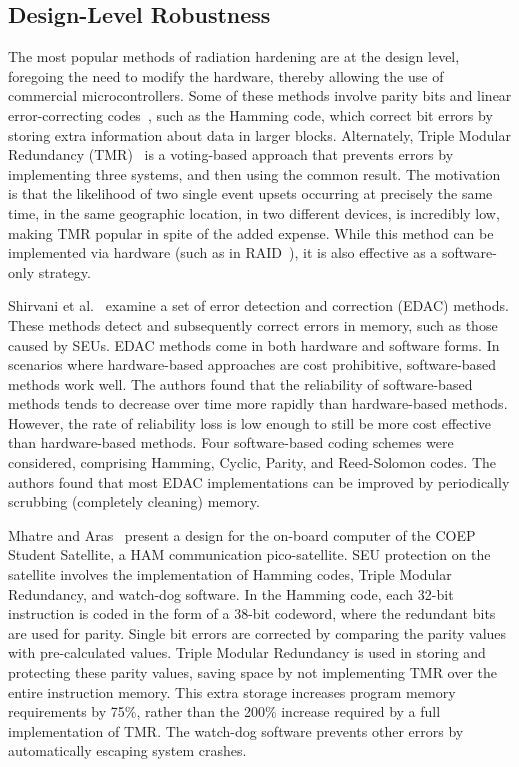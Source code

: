 \subsection{Design-Level Robustness}

The most popular methods of radiation hardening are at the design level, foregoing the need to modify the hardware, thereby allowing the use of commercial microcontrollers.
Some of these methods involve parity bits and linear error-correcting codes~\cite{ErrorCorrectingCodes}, such as the Hamming code, which correct bit errors by storing extra information about data in larger blocks.
Alternately, Triple Modular Redundancy (TMR)~\cite{TMR} is a voting-based approach that prevents errors by implementing three systems, and then using the common result.
The motivation is that the likelihood of two single event upsets occurring at precisely the same time, in the same geographic location, in two different devices, is incredibly low, making TMR popular in spite of the added expense.
While this method can be implemented via hardware (such as in RAID~\cite{RAID}), it is also effective as a software-only strategy.

Shirvani et al.~\cite{Shirvani2001EDAC} examine a set of error detection and correction (EDAC) methods.
These methods detect and subsequently correct errors in memory, such as those caused by SEUs.
EDAC methods come in both hardware and software forms.
In scenarios where hardware-based approaches are cost prohibitive, software-based methods work well.
The authors found that the reliability of software-based methods tends to decrease over time more rapidly than hardware-based methods.
However, the rate of reliability loss is low enough to still be more cost effective than hardware-based methods.
Four software-based coding schemes were considered, comprising Hamming, Cyclic, Parity, and Reed-Solomon codes.
The authors found that most EDAC implementations can be improved by periodically scrubbing (completely cleaning) memory.

Mhatre and Aras~\cite{mhatreSeuTmr} present a design for the on-board computer of the COEP Student Satellite, a HAM communication pico-satellite. 
SEU protection on the satellite involves the implementation of Hamming codes, Triple Modular Redundancy, and watch-dog software.
In the Hamming code, each 32-bit instruction is coded in the form of a 38-bit codeword, where the redundant bits are used for parity.
Single bit errors are corrected by comparing the parity values with pre-calculated values.
Triple Modular Redundancy is used in storing and protecting these parity values, saving space by not implementing TMR over the entire instruction memory.
This extra storage increases program memory requirements by 75\%, rather than the 200\% increase required by a full implementation of TMR.
The watch-dog software prevents other errors by automatically escaping system crashes.


